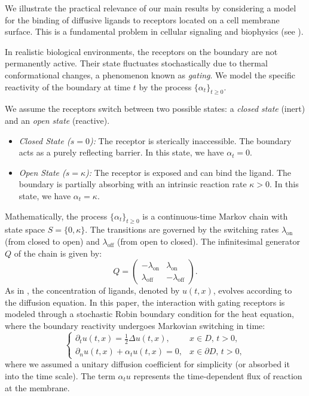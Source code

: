 \documentclass[11pt]{amsart}
\theoremstyle{plain}
\theoremstyle{definition}
\theoremstyle{remark}
\begin{document}
We illustrate the practical relevance of our main results by considering a model for the binding of diffusive ligands to receptors located on a cell membrane surface. This is a fundamental problem in cellular signaling and biophysics (see \cite{BergPurcell1977,Zwanzig1990}).

In realistic biological environments, the receptors on the boundary are not permanently active. Their state fluctuates stochastically due to thermal conformational changes, a phenomenon known as \textit{gating}. We model the specific reactivity of the boundary at time $t$ by the process $\{\alpha_t\}_{t\ge 0}$.

We assume the receptors switch between two possible states: a \textit{closed state} (inert) and an \textit{open state} (reactive).
\begin{itemize}
	\item \textit{Closed State ($s=0$):} The receptor is sterically inaccessible. The boundary acts as a purely reflecting barrier. In this state, we have $\alpha_t = 0$.
	\item \textit{Open State ($s=\kappa$):} The receptor is exposed and can bind the ligand. The boundary is partially absorbing with an intrinsic reaction rate $\kappa > 0$. In this state, we have $\alpha_t = \kappa$.
\end{itemize}

Mathematically, the process $\{\alpha_t\}_{t\ge 0}$ is a continuous-time Markov chain with state space $S=\{0, \kappa\}$. The transitions are governed by the switching rates $\lambda_{\text{on}}$ (from closed to open) and $\lambda_{\text{off}}$ (from open to closed). The infinitesimal generator $Q$ of the chain is given by:
\begin{equation}\label{eq:generator_Q}
	Q = \begin{pmatrix} 
		-\lambda_{\text{on}} & \lambda_{\text{on}} \\ 
		\lambda_{\text{off}} & -\lambda_{\text{off}} 
	\end{pmatrix}.
\end{equation}
As in \cite{Szabo1982}, the concentration of ligands, denoted by $u(t,x)$, evolves according to the diffusion equation. In this paper, the interaction with gating receptors is modeled through a stochastic Robin boundary condition for the heat equation, where the boundary reactivity undergoes Markovian switching in time:
\begin{equation}\label{eq:gated_system}
	\begin{cases}
		\partial_t u(t,x) = \tfrac{1}{2}\Delta u(t,x), & x \in D, \, t > 0, \\
		\partial_n u(t,x) + \alpha_t u(t,x) = 0, & x \in \partial D, \, t > 0,
	\end{cases}
\end{equation}
where we assumed a unitary diffusion coefficient for simplicity (or absorbed it into the time scale). The term $\alpha_t u$ represents the time-dependent flux of reaction at the membrane.
\end{document}
